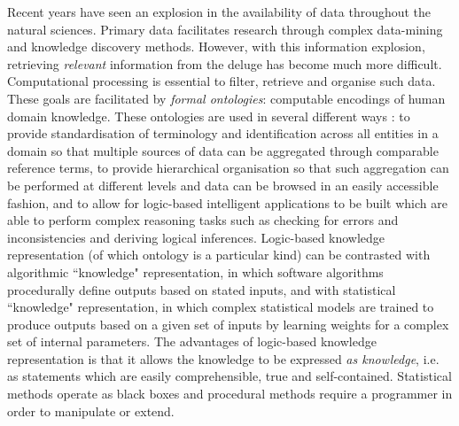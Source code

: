 \documentclass[10pt]{bmc_article}
\newenvironment{bmcformat}{\baselineskip20pt\sloppy\setboolean{publ}{false}}{\baselineskip20pt\sloppy}
\begin{document}
\begin{bmcformat}
Recent years have seen an explosion in the availability of data throughout the natural sciences. Primary data facilitates research through complex data-mining and knowledge discovery methods. However, with this information explosion, retrieving \textit{relevant} information from the deluge has become much more difficult. Computational processing is essential to filter, retrieve and organise such data. These goals are facilitated by \textit{formal ontologies}: computable encodings of human domain knowledge. These ontologies are used in several different ways \cite{lambrix2004}: to provide standardisation of terminology and identification across all entities in a domain so that multiple sources of data can be aggregated through comparable reference terms, to provide hierarchical organisation so that such aggregation can be performed at different levels and data can be browsed in an easily accessible fashion, and to allow for logic-based intelligent applications to be built which are able to perform complex reasoning tasks such as checking for errors and inconsistencies and deriving logical inferences. Logic-based knowledge representation (of which ontology is a particular kind) can be contrasted with algorithmic ``knowledge" representation, in which software algorithms procedurally define outputs based on stated inputs, and with statistical ``knowledge" representation, in which complex statistical models are trained to produce outputs based on a given set of inputs by learning weights for a complex set of internal parameters.  The advantages of logic-based knowledge representation is that it allows the knowledge to be expressed \textit{as knowledge}, i.e. as statements which are easily comprehensible, true and self-contained.  Statistical methods operate as black boxes and procedural methods require a programmer in order to manipulate or extend. 


\end{bmcformat}
\end{document}
